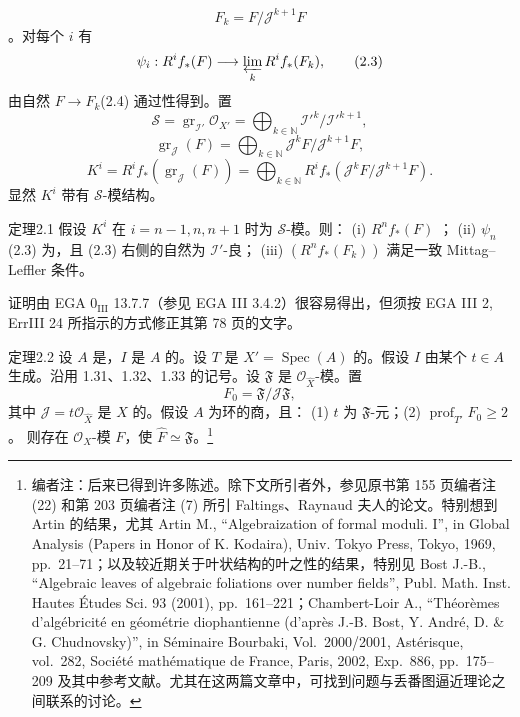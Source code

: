 \[F_k=F/\mathcal J^{k+1}F\tag{2.2}\]
。对每个 $i$ 有
\[\psi_i:R^if_*(F)\longrightarrow\varprojlim_kR^if_*(F_k),\tag{2.3}\]
由自然 $F\to F_k$\hfill(2.4) 通过性得到。置
\[\mathcal S=\operatorname{gr}_{\mathcal I'}\mathcal O_{X'}=\bigoplus_{k\in\mathbb N}\mathcal I'^k/\mathcal I'^{k+1},\tag{2.5}\]
\[\operatorname{gr}_{\mathcal J}(F)=\bigoplus_{k\in\mathbb N}\mathcal J^kF/\mathcal J^{k+1}F,\tag{2.6}\]
\[K^i=R^if_*(\operatorname{gr}_{\mathcal J}(F))=\bigoplus_{k\in\mathbb N}R^if_*(\mathcal J^kF/\mathcal J^{k+1}F).\tag{2.7}\]
显然 $K^i$ 带有 $\mathcal S$-模结构。
\begin{SGAresult}{定理}{2.1}
假设 $K^i$ 在 $i=n-1,n,n+1$ 时为 $\mathcal S$-模。则：
(i) $R^nf_*(F)$ ；
(ii)  $\psi_n$ (2.3) 为，且 (2.3) 右侧的自然为 $\mathcal I'$-良；
(iii)  $(R^nf_*(F_k))$ 满足一致 Mittag--Leffler 条件。
\end{SGAresult}
证明由 EGA $0_{\mathrm{III}}$ 13.7.7（参见 EGA III 3.4.2）很容易得出，但须按 EGA III 2, ErrIII 24 所指示的方式修正其第 78 页的文字。
\begin{SGAresult}{定理}{2.2}
设 $A$ 是，$I$ 是 $A$ 的。设 $T$ 是 $X'=\operatorname{Spec}(A)$ 的。假设 $I$ 由某个 $t\in A$ 生成。沿用 1.31、1.32、1.33 的记号。设 $\mathfrak F$ 是 $\mathcal O_{\widehat X}$-模。置
\[F_0=\mathfrak F/\mathcal J\mathfrak F,\tag{2.1}\]
其中 $\mathcal J=t\mathcal O_{\widehat X}$ 是 $\widehat X$ 的。假设 $A$ 为环的商，且：
(1) $t$ 为 $\mathfrak F$-元；(2) $\operatorname{prof}_{T'}F_0\geq2$。
则存在 $\mathcal O_X$-模 $F$，使 $\widehat F\simeq\mathfrak F$。\footnote{编者注：后来已得到许多陈述。除下文所引者外，参见原书第 155 页编者注 (22) 和第 203 页编者注 (7) 所引 Faltings、Raynaud 夫人的论文。特别想到 Artin 的结果，尤其 Artin M., ``Algebraization of formal moduli. I'', in Global Analysis (Papers in Honor of K. Kodaira), Univ. Tokyo Press, Tokyo, 1969, pp.~21--71；以及较近期关于叶状结构的叶之性的结果，特别见 Bost J.-B., ``Algebraic leaves of algebraic foliations over number fields'', Publ. Math. Inst. Hautes Études Sci. 93 (2001), pp.~161--221；Chambert-Loir A., ``Théorèmes d'algébricité en géométrie diophantienne (d'après J.-B. Bost, Y. André, D. \& G. Chudnovsky)'', in Séminaire Bourbaki, Vol.~2000/2001, Astérisque, vol.~282, Société mathématique de France, Paris, 2002, Exp.~886, pp.~175--209 及其中参考文献。尤其在这两篇文章中，可找到问题与丢番图逼近理论之间联系的讨论。}
\end{SGAresult}
